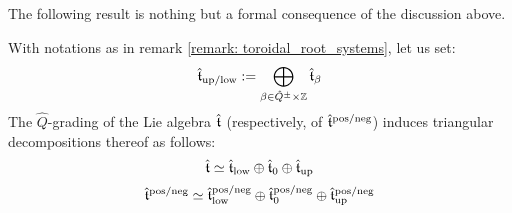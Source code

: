         The following result is nothing but a formal consequence of the discussion above.
        \begin{proposition} \label{prop: triangular_decomposition_of_extended_toroidal_lie_algebras}
            With notations as in remark \ref{remark: toroidal_root_systems}, let us set:
                $$\extendedtoroidal_{\up/\low} := \bigoplus_{\beta \in \hat{Q}^{\pm} \x \Z} \extendedtoroidal_{\beta}$$
            The $\hat{Q}$-grading of the Lie algebra $\hat{\mathfrak{t}}$ (respectively, of $\hat{\mathfrak{t}}^{\mathrm{pos}/\mathrm{neg}}$) induces triangular decompositions thereof as follows:
                $$\hat{\mathfrak{t}} \simeq \hat{\mathfrak{t}}_{\mathrm{low}} \oplus \hat{\mathfrak{t}}_0 \oplus \hat{\mathfrak{t}}_{\mathrm{up}}$$
                $$\hat{\mathfrak{t}}^{\mathrm{pos}/\mathrm{neg}} \simeq \hat{\mathfrak{t}}^{\mathrm{pos}/\mathrm{neg}}_{\mathrm{low}} \oplus \hat{\mathfrak{t}}^{\mathrm{pos}/\mathrm{neg}}_0 \oplus \hat{\mathfrak{t}}^{\mathrm{pos}/\mathrm{neg}}_{\mathrm{up}}$$
        \end{proposition}